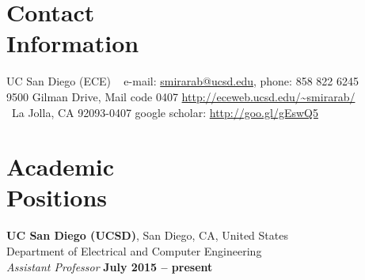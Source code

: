 \documentclass[margin,line,letterpaper]{resume}
\begin{document}
\begin{resume}

    \section{\mysidestyle Contact\\Information}
UC San Diego (ECE)  ~ \hfill e-mail: \url{smirarab@ucsd.edu},	phone: 858 822 6245   \vspace{0mm}\\\vspace{0mm} 
   9500 Gilman Drive, Mail code 0407  \hfill  \url{http://eceweb.ucsd.edu/~smirarab/}\vspace{0mm}\\\vspace{-4.5mm}%
   ~La Jolla, CA 92093-0407   	\hfill google scholar: \url{http://goo.gl/gEswQ5} \vspace{0mm}\\\vspace{-1.5mm}
   
      
    \section{\mysidestyle Academic\\Positions}

    \textbf{UC San Diego (UCSD)}, San Diego, CA, United States\\
    Department of Electrical and Computer Engineering\vspace{1mm}\\\vspace{0mm}%
    \textsl{Assistant Professor} \hfill \textbf{ July 2015 -- present}\vspace{-3mm}\\\vspace{-4mm}%

\end{resume}
\end{document}
